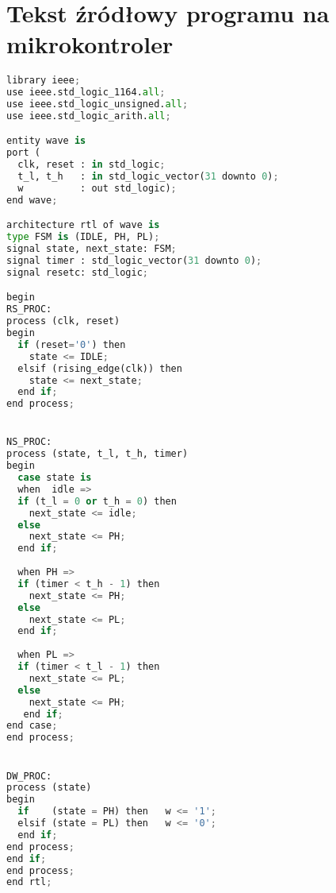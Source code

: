 \chapter{Tekst źródłowy programu na mikrokontroler}


\begin{lstlisting}[language=python,xleftmargin=0pt,  backgroundcolor={\color{white}}, caption={}, frame=""]
library ieee;
use ieee.std_logic_1164.all;
use ieee.std_logic_unsigned.all;
use ieee.std_logic_arith.all;

entity wave is
port (
  clk, reset : in std_logic;                           
  t_l, t_h   : in std_logic_vector(31 downto 0);  
  w          : out std_logic);
end wave;

architecture rtl of wave is
type FSM is (IDLE, PH, PL);
signal state, next_state: FSM;
signal timer : std_logic_vector(31 downto 0);
signal resetc: std_logic;

begin
RS_PROC:
process (clk, reset)
begin
  if (reset='0') then 
    state <= IDLE;
  elsif (rising_edge(clk)) then
    state <= next_state;
  end if;
end process;


NS_PROC:
process (state, t_l, t_h, timer)
begin
  case state is
  when  idle =>
  if (t_l = 0 or t_h = 0) then 
    next_state <= idle;
  else 
    next_state <= PH;
  end if;
  
  when PH =>  
  if (timer < t_h - 1) then  
    next_state <= PH;
  else
    next_state <= PL;
  end if;
    
  when PL =>
  if (timer < t_l - 1) then
    next_state <= PL;
  else
    next_state <= PH;    
   end if;    
end case;
end process;


DW_PROC:
process (state)
begin
  if    (state = PH) then   w <= '1';
  elsif (state = PL) then   w <= '0';
  end if;
end process;
end if;
end process;
end rtl;
\end{lstlisting}